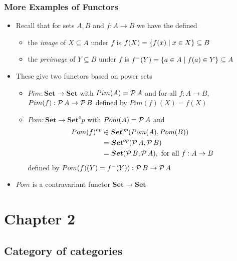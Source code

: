 \documentclass[handout]{beamer}
\newcommand{\bfsf}[1]{{\boldsymbol{#1}}}
\newcommand{\Set}{\bfsf{Set}}
\begin{document}
\frame
  {   
    \frametitle{More Examples of Functors}\label{Ch2:MoreExaFunctors}

 \begin{itemize}[<+->]
\item Recall that for sets $A,B$ and $f: A\to B$ we have the defined
   \begin{itemize}[<+->]
\item the \emph{image} of  $X\subseteq A$ under $f$ is 
$f(X)=\{f(x)\mid x\in X\} \subseteq B$ 
\item the \emph{preimage} of  $Y\subseteq B$ under $f$ is 
$f^-(Y)=\{a\in A \mid f(a)\in Y\} \subseteq A$ 
   \end{itemize}
\item These give two functors based on power sets
   \begin{itemize}[<+->]
\item $Pim:\Set\to\Set$ with $Pim(A) = \operatorname{\mathcal{P}} A$ and for all $f:A\to B$,
$Pim(f) : \operatorname{\mathcal{P}} A \to\operatorname{\mathcal{P}} B$ defined by $Pim(f)(X) = f(X)$
\item $Pom:\Set\to\Set^op$ with $Pom(A) = \operatorname{\mathcal{P}} A$ and %
\begin{align*}
Pom(f)^{op} &\in \Set^{op}(Pom(A),Pom(B))\\ & =  \Set^{op}(\powset A,\powset B) \\&=
\Set(\powset B,\powset A), \text{~for all $f:A\to B$}
\end{align*} defined by 
$Pom(f)(Y)= f^-(Y)): \operatorname{\mathcal{P}} B \to\operatorname{\mathcal{P}} A$
   \end{itemize}
\item $Pom$ is a contravariant functor $\Set\to\Set$
 \end{itemize}

 }


\section{Chapter 2}
\subsection{Category of categories}
\end{document}
